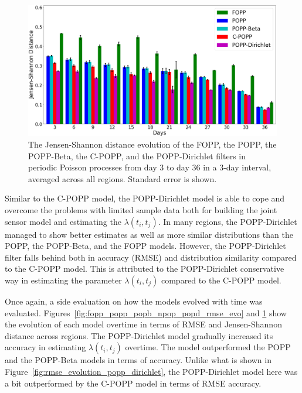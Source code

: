 \begin{figure}[t!]
	\centering
	\includegraphics[width=0.95\columnwidth]{./figures/fopp_popp_popb_npop_popd_kl_evo.png}
	\caption{The Jensen-Shannon distance evolution of the FOPP, the POPP, the POPP-Beta, the C-POPP, and the POPP-Dirichlet filters in periodic Poisson processes from day 3 to day 36 in a 3-day interval, averaged across all regions. Standard error is shown.}
	\label{fig:fopp_popp_popb_npop_popd_kl_evo}
\end{figure}

Similar to the C-POPP model, the POPP-Dirichlet model is able to cope and overcome the problems with limited sample data both for building the joint sensor model and estimating the $\lambda(t_i, t_j)$. In many regions, the POPP-Dirichlet managed to show better estimates as well as more similar distributions than the POPP, the POPP-Beta, and the FOPP models. However, the POPP-Dirichlet filter falls behind both in accuracy (RMSE) and distribution similarity compared to the C-POPP model. This is attributed to the POPP-Dirichlet conservative way in estimating the parameter $\lambda(t_i, t_j)$ compared to the C-POPP model.

Once again, a side evaluation on how the models evolved with time was evaluated. Figures~\ref{fig:fopp_popp_popb_npop_popd_rmse_evo} and \ref{fig:fopp_popp_popb_npop_popd_kl_evo} show the evolution of each model overtime in terms of RMSE and Jensen-Shannon distance across regions. The POPP-Dirichlet model gradually increased its accuracy in estimating $\lambda(t_i, t_j)$ overtime. The model outperformed the POPP and the POPP-Beta models in terms of accuracy. Unlike what is shown in Figure~\ref{fig:rmse_evolution_popp_dirichlet}, the POPP-Dirichlet model here was a bit outperformed by the C-POPP model in terms of RMSE accuracy.